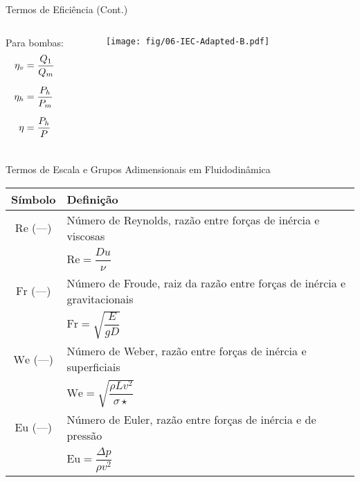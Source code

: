    \begin{frame}{Termos de Eficiência (Cont.)}\vspace*{-1em}
        \begin{columns}
            Para bombas:
            \begin{align*}
                \eta_v &= \dfrac{Q_1}{Q_m} \\[\medskipamount]
                \eta_h &= \dfrac{P_h}{P_m} \\[\medskipamount]
                \eta &= \dfrac{P_h}{P}
            \end{align*}
            \begin{center}
                \begin{figure}
                    \texttt{[image: fig/06-IEC-Adapted-B.pdf]}
                \end{figure}
            \end{center}
        \end{columns}
    \end{frame}

    \begin{frame}{Termos de Escala e Grupos Adimensionais em Fluidodinâmica}\vspace*{-1em}
        \setlength{\tabcolsep}{2mm}
        \noindent\begin{longtable}{cp{110mm}}
            \alert{Símbolo} & \alert{Definição} \\
            \hline
            $\mathrm{Re}$ (---) &
            Número de Reynolds, razão entre forças de inércia e viscosas \\
            & \alert{$\mathrm{Re} = \dfrac{Du}{\nu}$} \\
            $\mathrm{Fr}$ (---) &
            Número de Froude, raiz da razão entre forças de inércia e gravitacionais \\
            & \alert{$\mathrm{Fr} = \sqrt{\dfrac{E}{gD}}$} \\
            $\mathrm{We}$ (---) &
            Número de Weber, razão entre forças de inércia e superficiais \\
            & \alert{$\mathrm{We} = \sqrt{\dfrac{\rho L v^2}{\sigma\star}}$} \\
            $\mathrm{Eu}$ (---) &
            Número de Euler, razão entre forças de inércia e de pressão \\
            & \alert{$\mathrm{Eu} = \dfrac{\Delta p}{\rho v^2}$} \\
            \hline
        \end{longtable}
    \end{frame}

